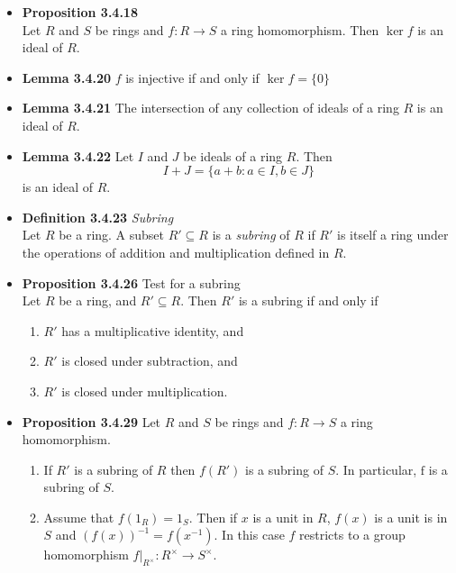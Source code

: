 \documentclass[11pt,a4paper]{article}
\begin{document}
\begin{itemize}
    \item \textbf{Proposition 3.4.18} \\
        Let $R$ and $S$ be rings and $f : R \to S$ a ring homomorphism.
        Then $\ker f$ is an ideal of $R$.

    \item \textbf{Lemma 3.4.20} $f$ is injective if and only if $\ker f = \{0\}$

    \item \textbf{Lemma 3.4.21} The intersection of any collection of ideals of a ring $R$
        is an ideal of $R$.

    \item \textbf{Lemma 3.4.22} Let $I$ and $J$ be ideals of a ring $R$.
        Then
        \[
            I + J = \{a + b : a \in I, b \in J \}
        \]
        is an ideal of $R$.

    \item \textbf{Definition 3.4.23} \emph{Subring} \\
        Let $R$ be a ring.
        A subset $R' \subseteq R$ is a \emph{subring} of $R$ if $R'$ is itself a ring under the
        operations of addition and multiplication defined in $R$.

    \item \textbf{Proposition 3.4.26} Test for a subring \\
        Let $R$ be a ring, and $R' \subseteq R$.
        Then $R'$ is a subring if and only if
        \begin{enumerate}
            \item $R'$ has a multiplicative identity, and
            \item $R'$ is closed under subtraction, and
            \item $R'$ is closed under multiplication.
        \end{enumerate}

    \item \textbf{Proposition 3.4.29} Let $R$ and $S$ be rings and $f : R \to S$
        a ring homomorphism.
        \begin{enumerate}
            \item If $R'$ is a subring of $R$ then $f(R')$ is a subring of $S$.
                In particular, $\mathrm{f}$ is a subring of $S$.
            \item Assume that $f(1_R) = 1_S$.
                Then if $x$ is a unit in $R$, $f(x)$ is a unit is in $S$ and
                ${(f(x))}^{-1} = f{(x^{-1})}$.
                In this case $f$ restricts to a group homomorphism
                $f|_{R^\times} : R^\times \to S^\times$.
        \end{enumerate}

\end{itemize}
\end{document}
